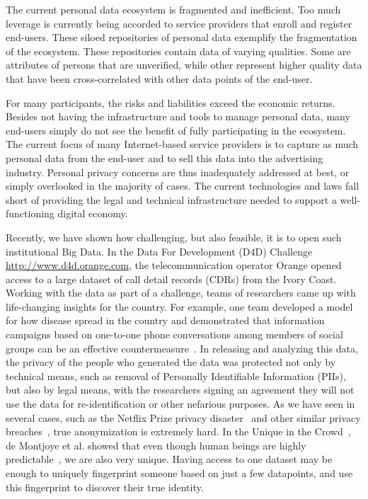 The current personal data ecosystem is fragmented and inefficient.
Too much leverage is currently being accorded to service providers that enroll
and register end-users.
These siloed repositories of personal data exemplify the fragmentation of the ecosystem.
These repositories contain data of varying qualities.
Some are attributes of persons that are unverified, while other represent higher quality data that have been cross-correlated with other data points of the end-user.

For many participants, the risks and liabilities exceed the economic returns.
Besides not having the infrastructure and tools to manage personal data, many end-users simply do not see the benefit of fully participating in the ecosystem.
The current focus of many Internet-based service providers is to capture as much personal data from the end-user and to sell this data into the advertising industry.
Personal privacy concerns are thus inadequately addressed at best, or simply overlooked in the majority of cases.
The current technologies and laws fall short of providing the legal and technical infrastructure needed to support a well-functioning digital economy.

Recently, we have shown how challenging, but also feasible, it is to open such institutional Big Data.
In the Data For Development (D4D) Challenge \url{http://www.d4d.orange.com}, the telecommunication operator Orange opened access to a large dataset of call detail records (CDRs) from the Ivory Coast.
Working with the data as part of a challenge, teams of researchers came up with life-changing insights for the country. For example, one team developed a model for how disease spread in the country and demonstrated that information campaigns based on one-to-one phone conversations among members of social groups can be an effective countermeasure~\cite{lima2013exploiting}. 
In releasing and analyzing this data, the privacy of the people who generated the data was protected not only by technical means, such as removal of Personally Identifiable Information (PIIs), but also by legal means, with the researchers signing an agreement they will not use the data for re-identification or other nefarious purposes.
As we have seen in several cases, such as the Netflix Prize privacy disaster~\cite{narayanan2008robust} and other similar privacy breaches~\cite{sweeney2000simple}, true anonymization is extremely hard.
In the Unique in the Crowd~\cite{de2013unique}, de Montjoye et al. showed that even though human beings are highly predictable~\cite{song2010limits}, we are also very unique.
Having access to one dataset may be enough to uniquely fingerprint someone based on just a few datapoints, and use this fingerprint to discover their true identity.

